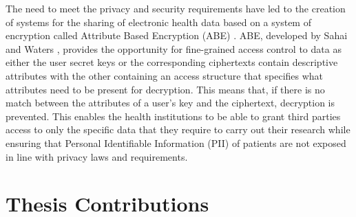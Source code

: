 

The need to meet the privacy and security requirements have led to the creation of systems for the sharing of electronic health data based on a system of encryption called Attribute Based Encryption (ABE) \cite{Ibraimi2010}\cite{Narayan2010}\cite{Akinyele2010}\cite{Barua2011}\cite{Alshehri}\cite{Hupperich2012}\cite{Hsieh2012}\cite{Li2013}. ABE, developed by Sahai and Waters \cite{Sahai2005}, provides the opportunity for fine-grained access control to data as either the user secret keys or the corresponding ciphertexts contain descriptive attributes with the other containing an access structure that specifies what attributes need to be present for decryption. This means that, if there is no match between the attributes of a user's key and the ciphertext, decryption is prevented. This enables the health institutions to be able to grant third parties access to only the specific data that they require to carry out their research while ensuring that Personal Identifiable Information (PII) of patients are not exposed in line with privacy laws and requirements.


\section{Thesis Contributions}

